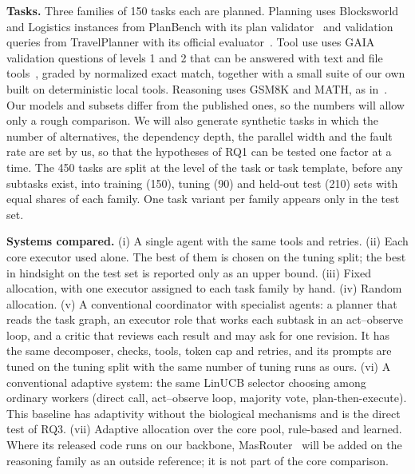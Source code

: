 \documentclass[11pt,a4paper]{article}
\newcommand{\runin}[1]{\textbf{#1}\quad}
\begin{document}
\runin{Tasks.}
Three families of 150 tasks each are planned. Planning uses Blocksworld and Logistics instances from
PlanBench with its plan validator~\cite{valmeekam2023planbench} and validation queries from TravelPlanner
with its official evaluator~\cite{xie2024travelplanner}. Tool use uses GAIA validation questions of levels
1 and 2 that can be answered with text and file tools~\cite{mialon2024gaia}, graded by normalized exact
match, together with a small suite of our own built on deterministic local tools. Reasoning uses GSM8K and
MATH, as in~\cite{yue2025masrouter}. Our models and subsets differ from the published ones, so the numbers
will allow only a rough comparison. We will also generate synthetic tasks in which the number of
alternatives, the dependency depth, the parallel width and the fault rate are set by us, so that the
hypotheses of RQ1 can be tested one factor at a time. The 450 tasks are split at the level of the task or
task template, before any subtasks exist, into training (150), tuning (90) and held-out test (210) sets
with equal shares of each family. One task variant per family appears only in the test set.

\runin{Systems compared.}
(i) A single agent with the same tools and retries. (ii) Each core executor used alone. The best of them
is chosen on the tuning split; the best in hindsight on the test set is reported only as an upper bound.
(iii) Fixed allocation, with one executor assigned to each task family by hand. (iv) Random allocation.
(v) A conventional coordinator with specialist agents: a planner that reads the task graph, an executor
role that works each subtask in an act--observe loop, and a critic that reviews each result and may ask for
one revision. It has the same decomposer, checks, tools, token cap and retries, and its prompts are tuned
on the tuning split with the same number of tuning runs as ours. (vi) A conventional adaptive system: the
same LinUCB selector choosing among ordinary workers (direct call, act--observe loop, majority vote,
plan-then-execute). This baseline has adaptivity without the biological mechanisms and is the direct test
of RQ3. (vii) Adaptive allocation over the core pool, rule-based and learned. Where its released code runs
on our backbone, MasRouter~\cite{yue2025masrouter} will be added on the reasoning family as an outside
reference; it is not part of the core comparison.
\end{document}
